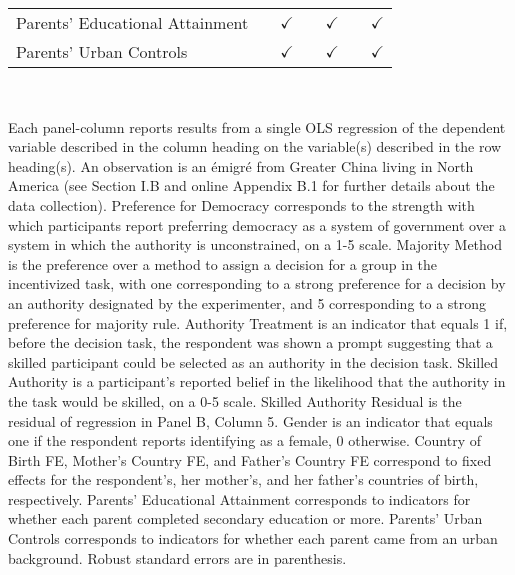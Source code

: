 \documentclass[]{article}
\begin{document}
\begin{table}
\begin{adjustbox}{width=\columnwidth,center}
{\begin{tabular}{l*{6}{c}}
Parents' Educational Attainment&         &$\checkmark$&         &$\checkmark$&         &$\checkmark$\\
Parents' Urban Controls&         &$\checkmark$&         &$\checkmark$&         &$\checkmark$\\
        \hline\hline        
\end{tabular}}
\end{adjustbox}
\\
\begin{adjustwidth}{-1cm}{-1cm}            
    \begin{scriptsize}      
        Each panel-column reports results from a single OLS regression of the dependent variable described in the column heading on the variable(s) described in the row heading(s). An observation is an émigré from Greater China living in North America (see Section I.B and online Appendix B.1 for further details about the data collection). Preference for Democracy corresponds to the strength with which participants report preferring democracy as a system of government over a system in which the authority is unconstrained, on a 1-5 scale. Majority Method is the preference over a method to assign a decision for a group in the incentivized task, with one corresponding to a strong preference for a decision by an authority designated by the experimenter, and 5 corresponding to a strong preference for majority rule. Authority Treatment is an indicator that equals 1 if, before the decision task, the respondent was shown a prompt suggesting that a skilled participant could be selected as an authority in the decision task. Skilled Authority is a participant's reported belief in the likelihood that the authority in the task would be skilled, on a 0-5 scale. Skilled Authority Residual is the residual of regression in Panel B, Column 5. Gender is an indicator that equals one if the respondent reports identifying as a female, 0 otherwise. Country of Birth FE, Mother's Country FE, and Father's Country FE correspond to fixed effects for the respondent's, her mother's, and her father’s countries of birth, respectively. Parents' Educational Attainment corresponds to indicators for whether each parent completed secondary education or more. Parents' Urban Controls corresponds to indicators for whether each parent came from an urban background. Robust standard errors are in parenthesis.           
    \end{scriptsize} 
\end{adjustwidth} 

\end{table}
\end{document}

